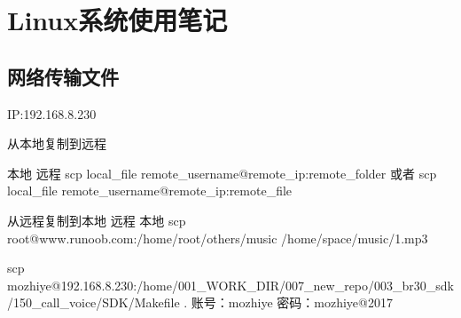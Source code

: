 \section{Linux系统使用笔记}
\subsection{网络传输文件}
IP:192.168.8.230

从本地复制到远程

        本地                           远程
scp local_file remote_username@remote_ip:remote_folder 
或者 
scp local_file remote_username@remote_ip:remote_file 

从远程复制到本地
        远程                                            本地
scp root@www.runoob.com:/home/root/others/music /home/space/music/1.mp3 

scp mozhiye@192.168.8.230:/home/001_WORK_DIR/007_new_repo/003_br30_sdk/150_call_voice/SDK/Makefile .
账号：mozhiye
密码：mozhiye@2017
